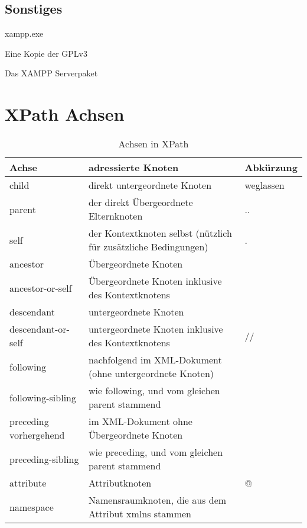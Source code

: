 \subsection*{Sonstiges}
\begin{VarDescription}{xampp.exe}
   \item[COPYING] Eine Kopie der GPLv3
   \item[xampp.exe] Das XAMPP Serverpaket
\end{VarDescription}

\section*{XPath Achsen}
{\small
  \begin{table}[Hb]
    \caption{Achsen in XPath\cite{wiki:de:xpath}}
    \label{table-axes}
    \begin{tabularx}{\textwidth}{l|X|l}
      Achse & adressierte Knoten & Abkürzung \\
      \hline
      child & direkt untergeordnete Knoten & weglassen \\
      parent & der direkt Übergeordnete Elternknoten  & .. \\
      self & der Kontextknoten selbst (nützlich für zusätzliche Bedingungen) & . \\
      ancestor & Übergeordnete Knoten & \\
      ancestor-or-self & Übergeordnete Knoten inklusive des Kontextknotens & \\
      descendant & untergeordnete Knoten & \\
      descendant-or-self & untergeordnete Knoten inklusive des Kontextknotens & // \\
      following & nachfolgend im XML-Dokument (ohne untergeordnete Knoten) & \\
      following-sibling & wie following, und vom gleichen parent stammend & \\
      preceding vorhergehend & im XML-Dokument ohne Übergeordnete Knoten & \\
      preceding-sibling & wie preceding, und vom gleichen parent stammend & \\
      attribute & Attributknoten & @ \\
      namespace & Namensraumknoten, die aus dem Attribut xmlns stammen &
    \end{tabularx}
  \end{table}
}

